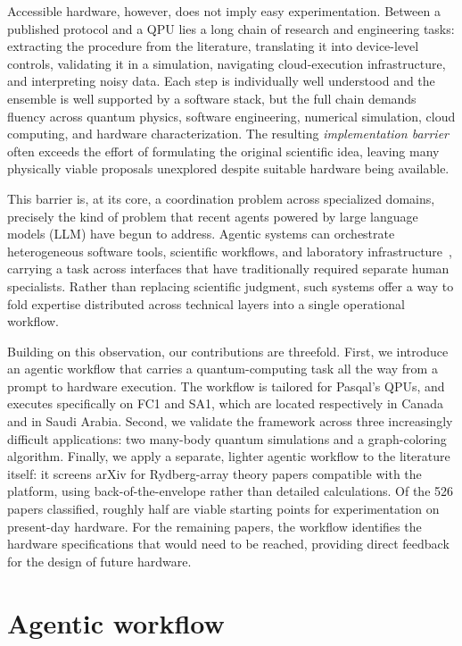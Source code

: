 \documentclass[aps,pra,reprint,amssymb,superscriptaddress,nofootinbib,floatfix]{revtex4-2}
\begin{document}
Accessible hardware, however, does not imply easy experimentation. Between a published protocol and a QPU lies a long chain of research and engineering tasks: extracting the procedure from the literature, translating it into device-level controls, validating it in a simulation, navigating cloud-execution infrastructure, and interpreting noisy data. Each step is individually well understood and the ensemble is well supported by a software stack, but the full chain demands fluency across quantum physics, software engineering, numerical simulation, cloud computing, and hardware characterization. The resulting \emph{implementation barrier} %
often exceeds the effort of formulating the original scientific idea, leaving many physically viable proposals unexplored despite suitable hardware being available.

This barrier is, at its core, a coordination problem across specialized domains, precisely the kind of problem that recent agents powered by large language models (LLM) have begun to address. Agentic systems can orchestrate heterogeneous software tools, scientific workflows, and laboratory infrastructure~\cite{boiko2023coscientist,bran2023chemcrow,lu2024aiscientist}, carrying a task across interfaces that have traditionally required separate human specialists.
Rather than replacing scientific judgment, such systems offer a way to fold expertise distributed across technical layers into a single operational workflow.

Building on this observation, our contributions are threefold. First, we introduce an agentic workflow that carries a quantum-computing task all the way from a prompt to hardware execution. The workflow is tailored for Pasqal's QPUs, and executes specifically on FC1 and SA1, which are located respectively in Canada and in Saudi Arabia.  Second, we validate the framework across three increasingly difficult applications: two many-body quantum simulations and a graph-coloring algorithm. Finally, we apply a separate, lighter agentic workflow to the literature itself: it screens arXiv for Rydberg-array theory papers compatible with the platform, using back-of-the-envelope rather than detailed calculations. Of the 526 papers classified, roughly half are viable starting points for experimentation on present-day hardware. For the remaining papers, the workflow identifies the hardware specifications that would need to be reached, providing direct feedback for the design of future hardware.


\section{Agentic workflow}\label{sec:wf}
\end{document}
